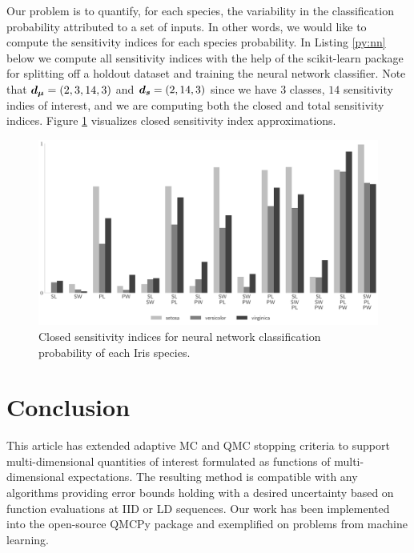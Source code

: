 \documentclass{article}[12pt]
\begin{document}
Our problem is to quantify, for each species, the variability in the classification probability attributed to a set of inputs. In other words, we would like to compute the sensitivity indices for each species probability. In Listing \ref{py:nn} below we compute all sensitivity indices with the help of the scikit-learn package \cite{scikit-learn} for splitting off a holdout dataset and training the neural network classifier. Note that $\boldsymbol{d}_{\boldsymbol{\mu}} = (2,3,14,3)$ and $\boldsymbol{d}_{\boldsymbol{s}} = (2,14,3)$ since we have $3$ classes, $14$ sensitivity indies of interest, and we are computing both the closed and total sensitivity indices. Figure \ref{fig:nn_si} visualizes closed sensitivity index approximations. 



\begin{figure}[t]
    \centering
    \includegraphics[width=.8\textwidth]{figs/nn_si.pdf}
    \caption{Closed sensitivity indices for neural network classification probability of each Iris species.}
    \label{fig:nn_si}
\end{figure}

\section{Conclusion} \label{sec:conclusions}

This article has extended adaptive MC and QMC stopping criteria to support multi-dimensional quantities of interest formulated as functions of multi-dimensional expectations. The resulting method is compatible with any algorithms providing error bounds holding with a desired uncertainty based on function evaluations at IID or LD sequences. Our work has been implemented into the open-source QMCPy package and exemplified on problems from machine learning. 

\printbibliography
\end{document}
